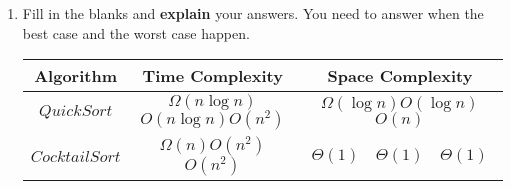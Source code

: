 \documentclass[12pt,a4paper]{article}
\theoremstyle{definition}
\begin{document}
\begin{enumerate}
\begin{minipage}[t]{0.45\textwidth}
\begin{algorithm}[H]
		$i\leftarrow i+1$\;
	}
\end{algorithm}
\end{minipage}

\begin{enumerate}
	 
\item Fill in the blanks and \textbf{explain} your answers. You need to answer when the best case and the worst case happen. 
\begin{table}[!h]

\label{Tab-compare}
	\centering
	\begin{threeparttable}
	\begin{tabular}{c|c| c }
		\toprule[2pt]
		\textbf{Algorithm} & \textbf{Time Complexity}\tnote{1} & \textbf{Space Complexity} \\
		\hline
		\hline
		$QuickSort$ &$\Omega(n\log n)$\quad $O(n\log n)$\quad $O(n^2)$& $\Omega(\log n)$\quad $O(\log n)$\quad$O(n)$\\

		$CocktailSort$&$\Omega(n)$\quad $O(n^2)$\quad $O(n^2)$& $\Theta(1)\quad\Theta(1)\quad \Theta(1)$   \\
		\bottomrule[2pt]


	\end{tabular}
	\end{threeparttable}
\end{table}


\end{enumerate}
\end{enumerate}
\end{document}
